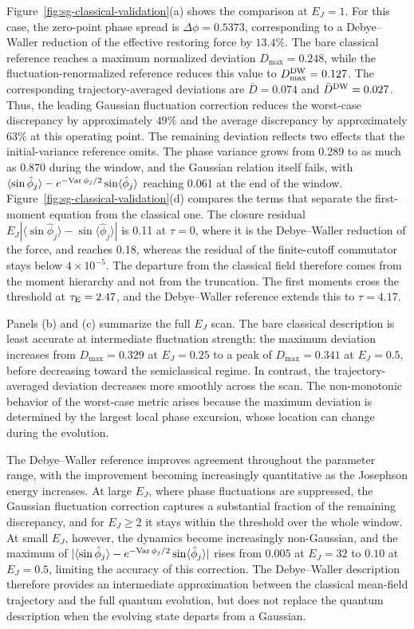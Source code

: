 \documentclass[pra,twocolumn,superscriptaddress,nofootinbib,floatfix]{revtex4-2}
\theoremstyle{remark}
\newcommand{\revcolor}{\color{blue}}
\DeclareRobustCommand{\rev}[1]{{\revcolor #1}}
\begin{document}
Figure~\ref{fig:sg-classical-validation}(a) shows the comparison at \(E_J=1\). For this case, the zero-point phase spread is \(\Delta\phi=0.5373\), corresponding to a Debye--Waller reduction of the effective restoring force by \(13.4\%\). The bare classical reference reaches a maximum normalized deviation \(D_{\max}=0.248\), while the fluctuation-renormalized reference reduces this value to \(D_{\max}^{\rm DW}=0.127\). \rev{The corresponding trajectory-averaged deviations are \(\bar D=0.074\) and \(\bar D^{\rm DW}=0.027\).} Thus, the leading Gaussian fluctuation correction reduces the worst-case discrepancy by approximately \(49\%\) and the average discrepancy by approximately \(63\%\) at this operating point. \rev{The remaining deviation reflects two effects that the initial-variance reference omits.} \rev{The phase variance grows from 0.289 to as much as 0.870 during the window, and the Gaussian relation itself fails, with \(\langle\sin\hat\phi_j\rangle-e^{-{\rm Var}\,\phi_j/2}\sin\langle\hat\phi_j\rangle\) reaching 0.061 at the end of the window.} \rev{Figure~\ref{fig:sg-classical-validation}(d) compares the terms that separate the first-moment equation from the classical one.} \rev{The closure residual \(E_J|\langle\sin\hat\phi_j\rangle-\sin\langle\hat\phi_j\rangle|\) is 0.11 at \(\tau=0\), where it is the Debye--Waller reduction of the force, and reaches 0.18, whereas the residual of the finite-cutoff commutator stays below \(4\times10^{-5}\).} \rev{The departure from the classical field therefore comes from the moment hierarchy and not from the truncation.} \rev{The first moments cross the threshold at \(\tau_{\rm E}=2.47\), and the Debye--Waller reference extends this to \(\tau=4.17\).}

Panels (b) and (c) summarize the full \(E_J\) scan. The bare classical description is least accurate at intermediate fluctuation strength: the maximum deviation increases from \(D_{\max}=0.329\) at \(E_J=0.25\) to a peak of \(D_{\max}=0.341\) at \(E_J=0.5\), before decreasing toward the semiclassical regime. In contrast, the trajectory-averaged deviation decreases more smoothly across the scan. The non-monotonic behavior of the worst-case metric arises because the maximum deviation is determined by the largest local phase excursion, whose location can change during the evolution.

The Debye--Waller reference improves agreement throughout the parameter range, with the improvement becoming increasingly quantitative as the Josephson energy increases. \rev{At large \(E_J\), where phase fluctuations are suppressed, the Gaussian fluctuation correction captures a substantial fraction of the remaining discrepancy, and for \(E_J\ge2\) it stays within the threshold over the whole window.} \rev{At small \(E_J\), however, the dynamics become increasingly non-Gaussian, and the maximum of \(|\langle\sin\hat\phi_j\rangle-e^{-{\rm Var}\,\phi_j/2}\sin\langle\hat\phi_j\rangle|\) rises from \(0.005\) at \(E_J=32\) to \(0.10\) at \(E_J=0.5\), limiting the accuracy of this correction.} \rev{The Debye--Waller description therefore provides an intermediate approximation between the classical mean-field trajectory and the full quantum evolution, but does not replace the quantum description when the evolving state departs from a Gaussian.}
\end{document}
